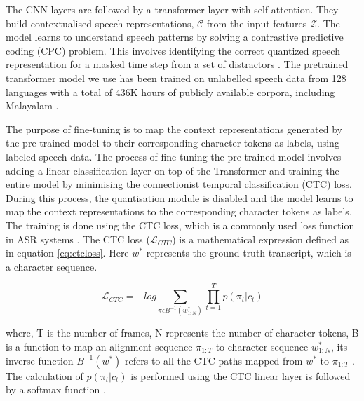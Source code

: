 \documentclass[runningheads]{llncs}
\begin{document}
The CNN layers are followed by a transformer layer with self-attention. They build contextualised speech representations, $\mathcal{C}$ from the input features $\mathcal{Z}$. The model learns to understand speech patterns by solving a contrastive predictive coding (CPC) problem. This involves identifying the correct quantized speech representation for a masked time step from a set of distractors \cite{babu2021xls}. The pretrained transformer model we use has been trained on unlabelled speech data from 128 languages with a total of 436K hours of publicly available corpora, including Malayalam \cite{babu2021xls}.




The purpose of fine-tuning is to map the context representations generated by the pre-trained model to their corresponding character tokens as labels, using labeled speech data. The process of fine-tuning the pre-trained model involves adding a linear classification layer on top of the Transformer and training the entire model by minimising the connectionist temporal classification (CTC) loss. During this process, the quantisation module is disabled and the model learns to map the context representations to the corresponding character tokens as labels. The training is done using the CTC loss, which is a commonly used loss function in ASR systems \cite{graves2006connectionist}. The CTC loss ($\mathcal{L}_{CTC}$) is a mathematical expression defined as in equation \ref{eq:ctcloss}. Here $w^*$ represents the ground-truth transcript, which is a character sequence.

\begin{equation}
\label{eq:ctcloss}
    \mathcal{L}_{CTC} = -log \sum_{\pi \epsilon B^{-1}(w^{*}_{1:N})}{\prod_{t=1}^{T}p(\pi_t|c_t)}
\end{equation}

where, T is the number of frames,  N represents the number of character tokens, B is a function to map an alignment sequence $\pi_{1:T}$ to character sequence $w^{*}_{1:N}$, its inverse function $B^{−1}(w^*)$ refers to all the CTC paths mapped from $w^*$ to $\pi_{1:T}$ . The calculation of $p(\pi_t|c_t)$ is performed using the CTC linear layer is followed by a softmax function \cite{graves2006connectionist,ou2022towards}.
\end{document}
